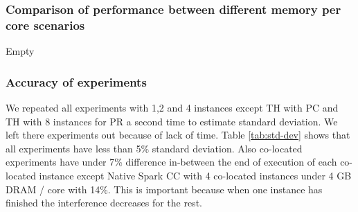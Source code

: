 \subsubsection{Comparison of performance between different memory per core scenarios}
Empty

\subsubsection{Accuracy of experiments}

We repeated all experiments with 1,2 and 4 instances except TH with PC and TH with 8 instances for PR a second time to estimate standard deviation. We left there experiments out because of lack of time. Table \ref{tab:std-dev} shows that 
all experiments have less than 5\% standard deviation. Also co-located experiments have under 7\% difference in-between the end of execution of each co-located instance except Native Spark CC with 4 co-located instances under 4 GB DRAM / core with 14\%. This is important because when one instance has finished the interference decreases for the rest.

